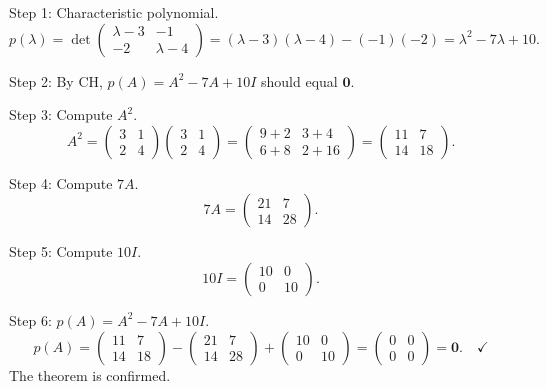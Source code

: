 \documentclass[12pt,a4paper]{article}
\begin{document}
Step 1: Characteristic polynomial.
\[
  p(\lambda) = \det\!\begin{pmatrix} \lambda-3 & -1 \\ -2 & \lambda-4 \end{pmatrix}
             = (\lambda-3)(\lambda-4) - (-1)(-2)
             = \lambda^{2} - 7\lambda + 10.
\]

Step 2: By CH, $p(A) = A^{2} - 7A + 10I$ should equal $\mathbf{0}$.

Step 3: Compute $A^{2}$.
\[
  A^{2} = \begin{pmatrix} 3 & 1 \\ 2 & 4 \end{pmatrix}\begin{pmatrix} 3 & 1 \\ 2 & 4 \end{pmatrix}
        = \begin{pmatrix} 9+2 & 3+4 \\ 6+8 & 2+16 \end{pmatrix}
        = \begin{pmatrix} 11 & 7 \\ 14 & 18 \end{pmatrix}.
\]

Step 4: Compute $7A$.
\[
  7A = \begin{pmatrix} 21 & 7 \\ 14 & 28 \end{pmatrix}.
\]

Step 5: Compute $10I$.
\[
  10I = \begin{pmatrix} 10 & 0 \\ 0 & 10 \end{pmatrix}.
\]

Step 6: $p(A) = A^{2} - 7A + 10I$.
\[
  p(A) = \begin{pmatrix} 11 & 7 \\ 14 & 18 \end{pmatrix}
       - \begin{pmatrix} 21 & 7 \\ 14 & 28 \end{pmatrix}
       + \begin{pmatrix} 10 & 0 \\ 0 & 10 \end{pmatrix}
       = \begin{pmatrix} 0 & 0 \\ 0 & 0 \end{pmatrix} = \mathbf{0}. \quad \checkmark
\]
The theorem is confirmed.

\end{document}
